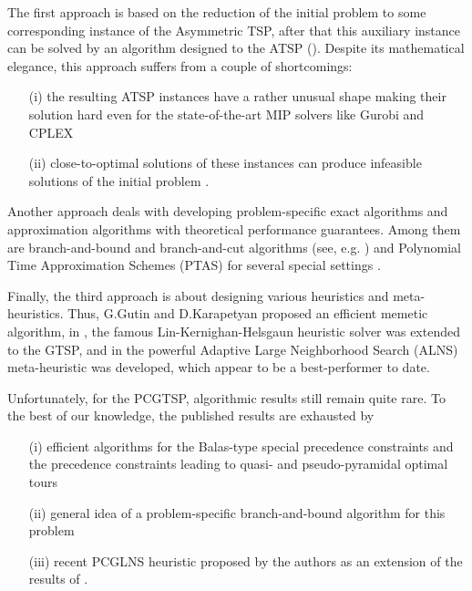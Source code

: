 The first approach is based on the reduction of the initial problem to some corresponding instance of the Asymmetric TSP, after that this auxiliary instance can be solved by an algorithm designed to the ATSP (\cite{LaporteSemet1999,NoonBean1993}). Despite its mathematical elegance, this approach suffers from a couple of shortcomings: 
\begin{itemize}
\item[(i)] the resulting ATSP instances have a rather unusual shape making their solution hard even for the state-of-the-art MIP solvers like Gurobi and CPLEX 
\item[(ii)] close-to-optimal solutions of these instances can produce infeasible solutions of the initial problem \cite{KaraGut2012}.
\end{itemize}

Another approach deals with developing problem-specific exact algorithms and approximation algorithms with theoretical performance guarantees. Among them are branch-and-bound and branch-and-cut algorithms (see, e.g. \cite{FishGonToth1997,Yuan2020}) and Polynomial Time Approximation Schemes (PTAS) for several special settings \cite{FerGriSit2006,KhN-PSIM2017}.  

Finally, the third approach is about designing various heuristics and meta-heuristics. Thus, G.Gutin and D.Karapetyan \cite{Gutin-2010} proposed an efficient memetic algorithm, in \cite{Helsgaun-2015}, the famous Lin-Kernighan-Helsgaun heuristic solver was extended to the GTSP, and in \cite{SMITH20171} the powerful Adaptive Large Neighborhood Search (ALNS) meta-heuristic was developed, which appear to be a best-performer to date. 

Unfortunately, for the PCGTSP, algorithmic results still remain quite rare. To the best of our knowledge, the published results are exhausted by
\begin{itemize}
	\item[(i)] efficient algorithms for the Balas-type special precedence constraints \cite{Balas-Sim2001,ChenKhKh2016,CKK-IFAC2016} and the precedence constraints leading to quasi- and pseudo-pyramidal optimal tours \cite{KhN-AMAI-2020}
	\item[(ii)] general idea of a problem-specific branch-and-bound algorithm for this problem \cite{SALMAN2020163}
	\item[(iii)] recent PCGLNS heuristic proposed by the authors \cite{KKP-optima2020} as an extension of the results of \cite{SMITH20171}. 
\end{itemize} 


